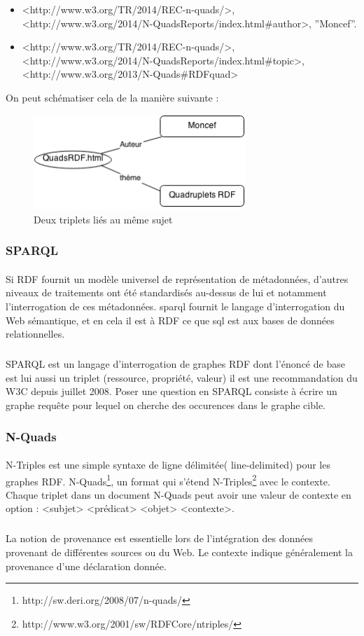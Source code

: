 \documentclass[12pt,a4]{report}
\begin{document}
\begin{itemize}
\item <http://www.w3.org/TR/2014/REC-n-quads/>,<http://www.w3.org/2014/N-QuadsReports/index.html\#author>, ''Moncef''.
\item <http://www.w3.org/TR/2014/REC-n-quads/>,<http://www.w3.org/2014/N-QuadsReports/index.html\#topic>,<http://www.w3.org/2013/N-Quads\#RDFquad>
\end{itemize}
On peut schématiser cela de la manière suivante :
\begin{figure}[H]
\centering
\centering
\includegraphics[width=8cm]{Diag.png}
\caption{Deux triplets liés au même sujet}

\end{figure}
\subsubsection{SPARQL}
\paragraph{}
Si RDF fournit un modèle universel de représentation de métadonnées, d'autres niveaux de traitements ont été standardisés au-dessus de lui et notamment l'interrogation de ces métadonnées. 
\gls{sparql} fournit le langage d'interrogation du Web sémantique, et en cela il est à RDF ce que \gls{sql} est aux bases de données relationnelles.
\subparagraph{}
SPARQL est un langage d'interrogation de graphes RDF dont l'énoncé de base est lui aussi un triplet (ressource, propriété, valeur) il est une recommandation du W3C depuis juillet 2008.
Poser une question en SPARQL consiste à écrire un graphe requête pour lequel on cherche des occurences dans le graphe cible.
\subsubsection{N-Quads}
\paragraph{}
N-Triples est une simple syntaxe de ligne délimitée( line-delimited) pour les graphes RDF. N-Quads\footnote{http://sw.deri.org/2008/07/n-quads/}, un format qui s'étend N-Triples\footnote{http://www.w3.org/2001/sw/RDFCore/ntriples/} avec le contexte. Chaque triplet dans un document N-Quads peut avoir une valeur de contexte en option :
<subjet> <prédicat> <objet> <contexte>.
\subparagraph{}
La notion de provenance est essentielle lors de l'intégration des données provenant de différentes sources ou du Web. Le contexte indique généralement la provenance d'une déclaration donnée.
\end{document}
